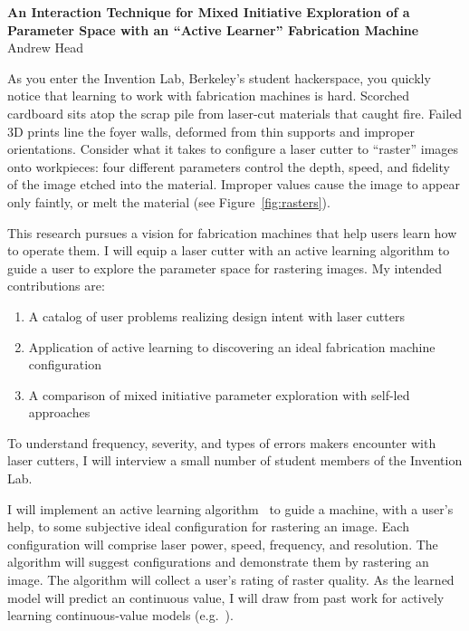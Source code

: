 \documentclass[12pt]{article}
\begin{document}

\begin{center}
  \textbf{An Interaction Technique for Mixed Initiative Exploration of a\\
    Parameter Space with an ``Active Learner'' Fabrication Machine}\\
  \vspace{.5em}
  Andrew Head
\end{center}

As you enter the Invention Lab, Berkeley's student hackerspace, you quickly notice that learning to work with fabrication machines is hard.
Scorched cardboard sits atop the scrap pile from laser-cut materials that caught fire.
Failed 3D prints line the foyer walls, deformed from thin supports and improper orientations.
Consider what it takes to configure a laser cutter to ``raster'' images onto workpieces:
four different parameters control the depth, speed, and fidelity of the image etched into the material.
Improper values cause the image to appear only faintly, or melt the material (see Figure~\ref{fig:rasters}).


This research pursues a vision for fabrication machines that help users learn how to operate them.
I will equip a laser cutter with an active learning algorithm to guide a user to explore the parameter space for rastering images.
My intended contributions are:
\begin{enumerate}[noitemsep]
\item A catalog of user problems realizing design intent with laser cutters
\item Application of active learning to discovering an ideal fabrication machine configuration
\item A comparison of mixed initiative parameter exploration with self-led approaches
\end{enumerate}

To understand frequency, severity, and types of errors makers encounter with laser cutters, I will interview a small number of student members of the Invention Lab.

I will implement an active learning algorithm~\cite{settles_active_2010} to guide a machine, with a user's help, to some subjective ideal configuration for rastering an image.
Each configuration will comprise laser power, speed, frequency, and resolution.
The algorithm will suggest configurations and demonstrate them by rastering an image.
The algorithm will collect a user's rating of raster quality.
As the learned model will predict an continuous value, I will draw from past work for actively learning continuous-value models (e.g.~\cite{sugiyama_active_2008}).
\end{document}
